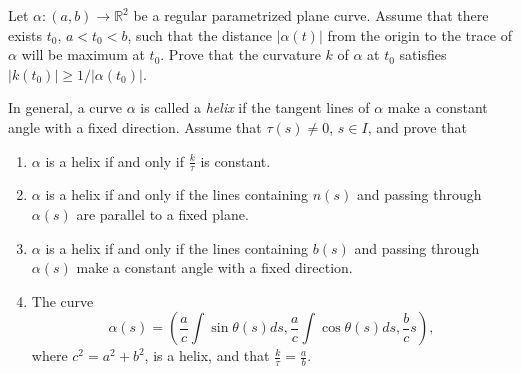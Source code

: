 \documentclass[12pt]{article}
\newenvironment{problem}[2][Problem]{\begin{trivlist}
    \item[\hskip \labelsep {\bfseries #1}\hskip \labelsep {\bfseries #2.}]}{\end{trivlist}}
\theoremstyle{definition}
\begin{document}
\begin{problem}{1.5.14}
  Let \(\alpha:(a,b) \rightarrow \mathbb{R}^2\) be a regular parametrized plane curve.
  Assume that there exists \( t_0 \), \( a < t_0 < b \), such that the distance \( \left| \alpha(t) \right| \) from the origin to the trace of \(\alpha\) will be maximum at \( t_{0} \).
  Prove that the curvature \( k \) of \(\alpha\) at \( t_0 \) satisfies \( \left| k(t_0) \right| \geq 1/\left| \alpha(t_0) \right|\).
\end{problem}

\begin{problem}{1.5.17}
  In general, a curve \(\alpha\) is called a \textit{helix} if the tangent lines of \(\alpha\) make a constant angle with a fixed direction.
  Assume that \(\tau(s) \neq 0\), \( s \in I \), and prove that
  \begin{enumerate}[label=(\alph*)]
    \item \(\alpha\) is a helix if and only if \( \frac{k}{\tau} \) is constant.
    \item \(\alpha\) is a helix if and only if the lines containing \( n(s) \) and passing through \( \alpha(s) \) are parallel to a fixed plane.
    \item \(\alpha\) is a helix if and only if the lines containing \( b(s) \) and passing through \(\alpha(s)\) make a constant angle with a fixed direction.
    \item The curve
          \begin{equation}
          \label{eq:2}
          \alpha(s) = \left( \frac{a}{c} \int\sin\theta(s) ds, \frac{a}{c} \int\cos\theta(s) ds, \frac{b}{c} s \right),
          \end{equation}
          where \( c^2 = a^2 + b^2 \), is a helix, and that \( \frac{k}{\tau} = \frac{a}{b} \).
  \end{enumerate}
\end{problem}
\end{document}

